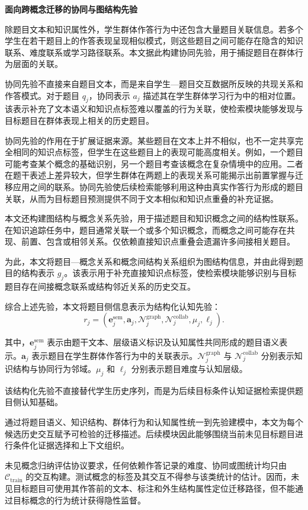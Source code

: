 \documentclass[UTF8,a4paper,12pt]{ctexart}
\numberwithin{table}{section}
\begin{document}
\noindent\textbf{面向跨概念迁移的协同与图结构先验}

除题目文本和知识属性外，学生群体作答行为中还包含大量题目关联信息。若多个学生在若干题目上的作答表现呈现相似模式，则这些题目之间可能存在隐含的知识联系、难度联系或学习路径联系。本文据此构建协同先验，用于捕捉题目在群体行为层面的关联。

协同先验不直接来自题目文本，而是来自学生—题目交互数据所反映的共现关系和作答模式。对于题目 \(q_j\)，协同表示 \(a_j\) 描述其在学生群体学习行为中的相对位置。该表示补充了文本语义和知识点标签难以覆盖的行为关联，使检索模块能够发现与目标题目在群体表现上相关的历史题目。

协同先验的作用在于扩展证据来源。某些题目在文本上并不相似，也不一定共享完全相同的知识点标签，但学生在这些题目上的表现可能高度相关。例如，一个题目可能考查某个概念的基础识别，另一个题目考查该概念在复杂情境中的应用。二者在题干表述上差异较大，但学生群体在两题上的表现关系可能揭示出前置掌握与迁移应用之间的联系。协同先验使后续检索能够利用这种由真实作答行为形成的题目关联，从而为目标题目预测提供不同于文本相似和知识点重叠的补充证据。

本文还构建图结构与概念关系先验，用于描述题目和知识概念之间的结构性联系。在知识追踪任务中，题目通常关联一个或多个知识概念，而概念之间可能存在共现、前置、包含或相邻关系。仅依赖直接知识点重叠会遗漏许多间接相关题目。

为此，本文将题目—概念关系和概念间结构关系组织为图结构信息，并由此得到题目的结构表示 \(g_j\)。该表示用于补充直接知识点标签，使检索模块能够识别与目标题目存在间接概念联系或结构邻近关系的历史交互。

综合上述先验，本文将题目侧信息表示为结构化认知先验：
\[
r_j=\left(\mathbf e_j^{\mathrm{sem}},\mathbf a_j,\mathcal N_j^{\mathrm{graph}},\mathcal N_j^{\mathrm{collab}},\mu_j,\ell_j\right).
\]

其中，\(\mathbf e_j^{\mathrm{sem}}\) 表示由题干文本、层级语义标识及认知属性共同形成的题目语义表示。\(\mathbf a_j\) 表示题目在学生群体作答行为中的关联表示。\(\mathcal N_j^{\mathrm{graph}}\) 与 \(\mathcal N_j^{\mathrm{collab}}\) 分别表示知识结构与协同行为邻域。\(\mu_j\) 和 \(\ell_j\) 分别表示题目难度与认知层级。

该结构化先验不直接替代学生历史序列，而是为后续目标条件认知证据检索提供题目侧认知基础。



通过将题目语义、知识结构、群体行为和认知属性统一到先验建模中，本文为每个候选历史交互赋予可检验的迁移描述。后续模块因此能够围绕当前未见目标题目进行条件化证据选择和上下文组织。

未见概念归纳评估协议要求，任何依赖作答记录的难度、协同或图统计均只由 \(\mathcal{C}_{\mathrm{train}}\) 的交互构建。测试概念的标签及其交互不得参与该类统计的估计。因而，未见目标题目可使用其作答前的文本、标注和外生结构属性定位迁移路径，但不能通过目标概念的行为统计获得隐性监督。
\end{document}
